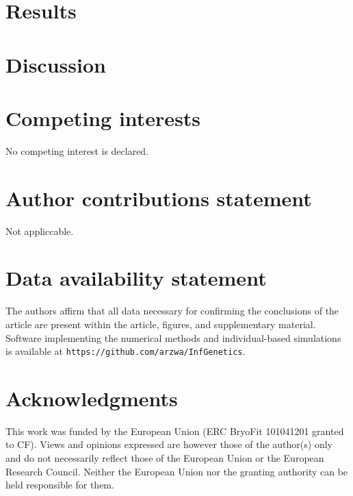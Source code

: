 \documentclass[unnumsec,webpdf,modern,large]{_oup-authoring-template}
\theoremstyle{thmstyleone}%
\theoremstyle{thmstyletwo}%
\theoremstyle{thmstylethree}%
\begin{document}
\section*{Results}

\section*{Discussion}

\section*{Competing interests}
No competing interest is declared.

\section*{Author contributions statement}
Not appliccable.

\section*{Data availability statement}

The authors affirm that all data necessary for confirming the conclusions of
the article are present within the article, figures, and supplementary
material. Software implementing the numerical methods and individual-based
simulations is available at \texttt{https://github.com/arzwa/InfGenetics}.

\section*{Acknowledgments}

This work was funded by the European Union (ERC BryoFit 101041201 granted to
CF). Views and opinions expressed are however those of the author(s) only and
do not necessarily reflect those of the European Union or the European Research
Council. Neither the European Union nor the granting authority can be held
responsible for them.


\begin{appendices}

\end{appendices}

%




\end{document}
